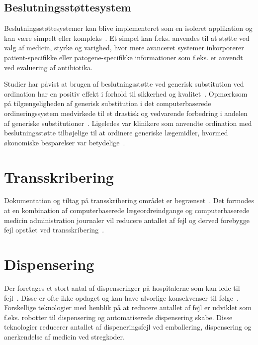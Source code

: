 \subsection{Beslutningsstøttesystem}
Beslutningsstøttesystemer kan blive implementeret som en isoleret applikation og kan være simpelt eller kompleks~\citep{Kaushal2002}. Et simpel kan f.eks. anvendes til at støtte ved valg af medicin, styrke og varighed, hvor mere avanceret systemer inkorporerer patient-specifikke eller patogene-specifikke informationer som f.eks. er anvendt ved evaluering af antibiotika.~\citep{Kaushal2002}

Studier har påvist at brugen af beslutningsstøtte ved generisk substitution ved ordination har en positiv effekt i forhold til sikkerhed og kvalitet~\citep{Stenner2010, Fischer2008}. Opmærksom på tilgængeligheden af generisk substitution i det computerbaserede ordineringssystem medvirkede til et drastisk og vedvarende forbedring i andelen af generiske substitutioner~\citep{Stenner2010}. Ligeledes var klinikere som anvendte ordination med beslutningsstøtte tilbøjelige til at ordinere generiske lægemidler, hvormed økonomiske besparelser var betydelige~\citep{Fischer2008}. %

\section{Transskribering}
Dokumentation og tiltag på transskribering området er begrænset~\citep{Kaushal2002}. Det formodes at en kombination af computerbaserede lægeordreindgange og computerbaserede medicin administration journaler vil reducere antallet af fejl og derved forebygge fejl opstået ved transskribering~\citep{Kaushal2002}.

\section{Dispensering}
Der foretages et stort antal af dispenseringer på hospitalerne som kan lede til fejl~\citep{Agrawal2009}. Disse er ofte ikke opdaget og kan have alvorlige konsekvenser til følge~\citep{Simpson2008}. Forskellige teknologier med henblik på at reducere antallet af fejl er udviklet som f.eks. robotter til dispensering og automatiserede dispensering skabe. Disse teknologier reducerer antallet af dispeneringsfejl ved emballering, dispensering og anerkendelse af medicin ved stregkoder.~\citep{Agrawal2009}

